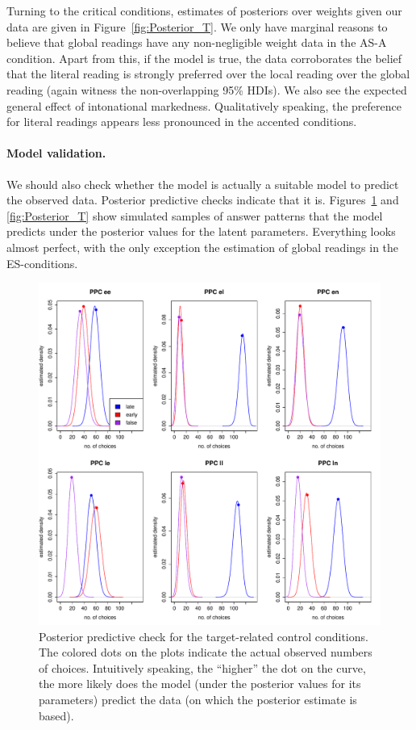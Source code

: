 \documentclass[fleqn,reqno,10pt]{article}
\begin{document}
Turning to the critical conditions, estimates of posteriors over
weights given our data are given in Figure~\ref{fig:Posterior_T}. We
only have marginal reasons to believe that global readings have any
non-negligible weight data in the AS-A condition. Apart from this, if
the model is true, the data corroborates the belief that the literal
reading is strongly preferred over the local reading over the global
reading (again witness the non-overlapping 95\% HDIs). We also see the expected general effect of intonational
markedness. Qualitatively speaking, the preference for literal
readings appears less pronounced in the accented conditions.


\paragraph{Model validation.} We should also check whether the model
is actually a suitable model to predict the observed data. Posterior
predictive checks indicate that it is. Figures~\ref{fig:Posterior_TF}
and \ref{fig:Posterior_T} show simulated samples of answer patterns
that the model predicts under the posterior values for the latent
parameters. Everything looks almost perfect, with the only exception
the estimation of global readings in the ES-conditions.

\begin{figure}
  \centering
  \includegraphics[width=\textwidth]{pics/PPC_TF.pdf}
  \caption{Posterior predictive check for the target-related control
    conditions. The colored dots on the plots indicate the actual
    observed numbers of choices. Intuitively speaking, the ``higher''
    the dot on the curve, the more likely does the model (under the
    posterior values for its parameters) predict the data (on which
    the posterior estimate is based).}
  \label{fig:Posterior_TF}
\end{figure}
\end{document}
